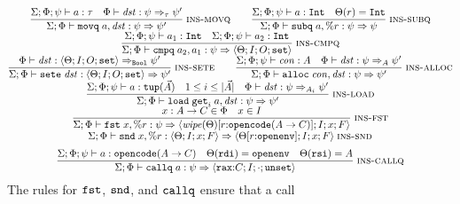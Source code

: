 {\small\figdefs
{}
\[
\begin{array}{@{}c@{}}
  \dfrac{\Sigma; \Phi; \psi \vdash a : \tau \quad \Phi \vdash \mathit{dst} : \psi \Rightarrow_\tau \psi'}
        {\Sigma; \Phi \vdash \kw{movq}\; a, \mathit{dst} : \psi \Rightarrow \psi'}\;\rulename{ins-movq}
  \qquad
  \dfrac{\Sigma; \Phi; \psi \vdash a : \kw{Int} \quad \Theta(r) = \kw{Int}}
        {\Sigma; \Phi \vdash \kw{subq}\; a, \%r : \psi \Rightarrow \psi}\;\rulename{ins-subq}
  \\[6pt]
  \dfrac{\Sigma; \Phi; \psi \vdash a_1 : \kw{Int} \quad \Sigma; \Phi; \psi \vdash a_2 : \kw{Int}}
        {\Sigma; \Phi \vdash \kw{cmpq}\; a_2, a_1 : \psi \Rightarrow \langle \Theta; I; O; \kw{set} \rangle}\;\rulename{ins-cmpq}
  \\[6pt]
  \dfrac{\Phi \vdash \mathit{dst} : \langle \Theta; I; O; \kw{set} \rangle \Rightarrow_{\kw{Bool}} \psi'}
        {\Sigma; \Phi \vdash \kw{sete}\; \mathit{dst} : \langle \Theta; I; O; \kw{set} \rangle \Rightarrow \psi'}\;\rulename{ins-sete}
  \qquad
  \dfrac{\Sigma; \Phi; \psi \vdash \mathit{con} : A \quad \Phi \vdash \mathit{dst} : \psi \Rightarrow_A \psi'}
        {\Sigma; \Phi \vdash \kw{alloc}\; \mathit{con}, \mathit{dst} : \psi \Rightarrow \psi'}\;\rulename{ins-alloc}
  \\[6pt]
  \dfrac{\Sigma; \Phi; \psi \vdash a : \kw{tup}(\vec{A}) \quad 1 \leq i \leq |\vec{A}| \quad \Phi \vdash \mathit{dst} : \psi \Rightarrow_{A_i} \psi'}
        {\Sigma; \Phi \vdash \kw{load}\; \kw{get}_i\; a, \mathit{dst} : \psi \Rightarrow \psi'}\;\rulename{ins-load}
  \\[6pt]
  \dfrac{x : A \rightarrow C \in \Phi \quad x \in I}
        {\Sigma; \Phi \vdash \kw{fst}\; x, \%r : \psi \Rightarrow
         \langle \mathit{wipe}(\Theta)[r{:}\kw{opencode}(A \rightarrow C)]; I; x; F \rangle}\;\rulename{ins-fst}
  \\[6pt]
  \Sigma; \Phi \vdash \kw{snd}\; x, \%r : \langle \Theta; I; x; F \rangle \Rightarrow
    \langle \Theta[r{:}\kw{openenv}]; I; x; F \rangle\;\rulename{ins-snd}
  \\[6pt]
  \dfrac{\Sigma; \Phi; \psi \vdash a : \kw{opencode}(A \rightarrow C) \quad \Theta(\kw{rdi}) = \kw{openenv}
         \quad \Theta(\kw{rsi}) = A}
        {\Sigma; \Phi \vdash \kw{callq}\; a : \psi \Rightarrow \langle \kw{rax}{:}C; I; \cdot; \kw{unset} \rangle}\;\rulename{ins-callq}
\end{array}
\]
}
The rules for $\mathtt{fst}$, $\mathtt{snd}$, and $\mathtt{callq}$ ensure that a call
